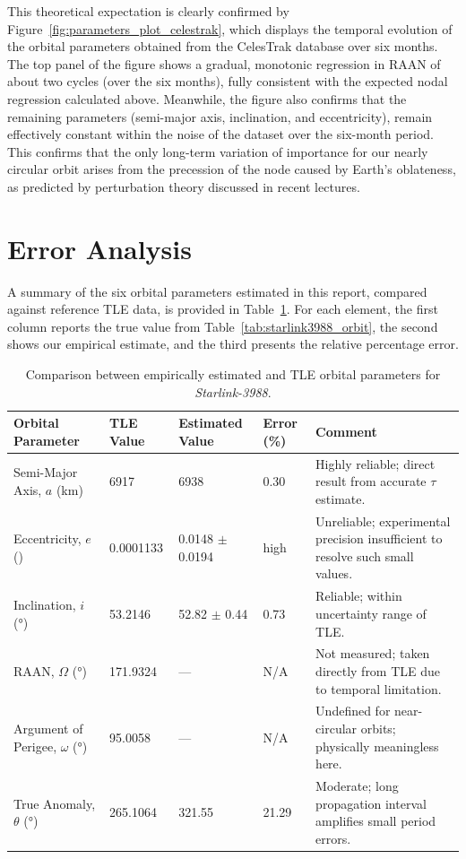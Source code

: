 \documentclass{article}
\begin{document}
This theoretical expectation is clearly confirmed by Figure~\ref{fig:parameters_plot_celestrak}, which displays the temporal evolution of the orbital parameters obtained from the CelesTrak database over six months. The top panel of the figure shows a gradual, monotonic regression in RAAN of about two cycles (over the six months), fully consistent with the expected nodal regression calculated above. Meanwhile, the figure also confirms that the remaining parameters (semi-major axis, inclination, and eccentricity), remain effectively constant within the noise of the dataset over the six-month period. This confirms that the only long-term variation of importance for our nearly circular orbit arises from the precession of the node caused by Earth’s oblateness, as predicted by perturbation theory discussed in recent lectures.

\section{Error Analysis} \label{sec:error_analysis}

A summary of the six orbital parameters estimated in this report, compared against reference TLE data, is provided in Table~\ref{tab:error_table}. For each element, the first column reports the true value from Table~\ref{tab:starlink3988_orbit}, the second shows our empirical estimate, and the third presents the relative percentage error.

\begin{table}[H]
    \centering
    \caption{Comparison between empirically estimated and TLE orbital parameters for \textit{Starlink-3988}.}
    \label{tab:error_table}
    \renewcommand{\arraystretch}{1.2}
    \begin{tabular}{|l|m{1.5cm}|m{2cm}|m{1cm}|m{3.5cm}|}
        \hline
        \textbf{Orbital Parameter} & \textbf{TLE Value} & \textbf{Estimated Value} & \textbf{Error (\%)} & \textbf{Comment} \\ \hline
        Semi-Major Axis, $a$ (\si{\kilo\metre}) & 6917 & 6938 & 0.30 & Highly reliable; direct result from accurate $\tau$ estimate. \\ \hline
        Eccentricity, $e$ () & 0.0001133 & 0.0148 $\pm$ 0.0194 & high & Unreliable; experimental precision insufficient to resolve such small values. \\ \hline
        Inclination, $i$ (\si{\degree}) & 53.2146 & 52.82 $\pm$ 0.44 & 0.73 & Reliable; within uncertainty range of TLE. \\ \hline
        RAAN, $\Omega$ (\si{\degree}) & 171.9324 & --- & N/A & Not measured; taken directly from TLE due to temporal limitation. \\ \hline
        Argument of Perigee, $\omega$ (\si{\degree}) & 95.0058 & --- & N/A & Undefined for near-circular orbits; physically meaningless here. \\ \hline
        True Anomaly, $\theta$ (\si{\degree}) & 265.1064 & 321.55 & 21.29 & Moderate; long propagation interval amplifies small period errors. \\ \hline
    \end{tabular}
\end{table}
\end{document}
